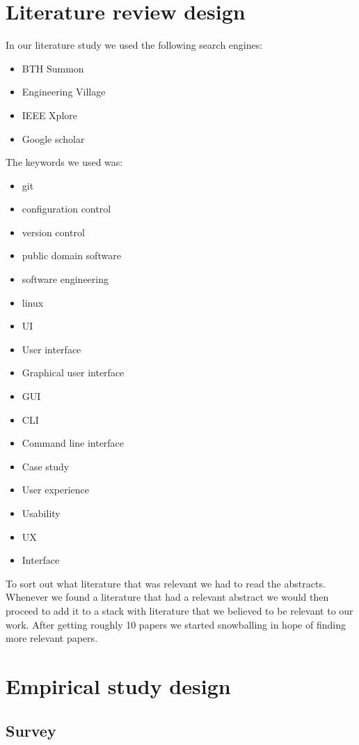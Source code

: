 \documentclass[a4paper,oneside]{bth} %
\begin{document}
			\section{Literature review design}
			In our literature study we used the following search engines:
			\begin{itemize}
			\item BTH Summon
			\item Engineering Village
			\item IEEE Xplore
			\item Google scholar
			\end{itemize}
			The keywords we used was:
			\begin{itemize}
			\item git
			\item configuration control
			\item version control
			\item public domain software
			\item software engineering
			\item linux
			\item UI
			\item User interface
			\item Graphical user interface
			\item GUI
			\item CLI
			\item Command line interface
			\item Case study
			\item User experience
			\item Usability
			\item UX
			\item Interface
			\end{itemize}
			
			To sort out what literature that was relevant we had to read the abstracts.
			Whenever we found a literature that had a relevant abstract we would then proceed to add it to a stack with literature that we believed to be relevant to our work.
			After getting roughly 10 papers we started snowballing in hope of finding more relevant papers.
			
			\section{Empirical study design}
			
				\subsection{Survey}
\end{document}
